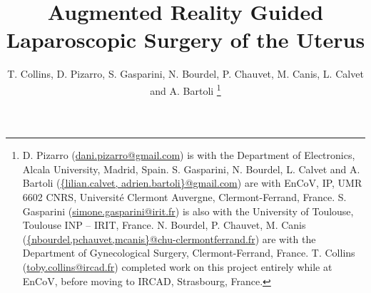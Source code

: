 \documentclass[journal]{IEEEtran}
\begin{document}
\title{Augmented Reality Guided \\Laparoscopic Surgery of the Uterus}
%
%
%

\author{T. Collins, D. Pizarro, S. Gasparini, N. Bourdel, P. Chauvet, M. Canis, L. Calvet and A. Bartoli%
\thanks{D. Pizarro (\url{dani.pizarro@gmail.com}) is with the Department of Electronics, Alcala University, Madrid, Spain. S. Gasparini, N. Bourdel, L. Calvet and A. Bartoli (\url{{lilian.calvet, adrien.bartoli}@gmail.com}) are with EnCoV, IP, UMR 6602 CNRS, Universit\'{e} Clermont Auvergne, Clermont-Ferrand, France. S. Gasparini (\url{simone.gasparini@irit.fr}) is also with the University of Toulouse, Toulouse INP -- IRIT, France.  N. Bourdel, P. Chauvet, M. Canis (\url{{nbourdel,pchauvet,mcanis}@chu-clermontferrand.fr}) are with the Department of Gynecological Surgery, Clermont-Ferrand, France. T. Collins (\url{toby.collins@ircad.fr}) completed work on this project entirely while at EnCoV, before moving to IRCAD, Strasbourg, France.}%
}

% 
%
\end{document}
